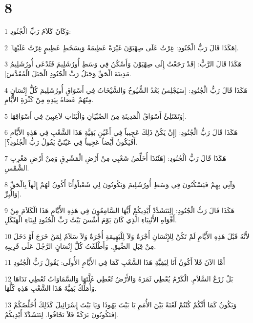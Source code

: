 \chapter{8}

\par 1 وَكَانَ كَلاَمُ رَبِّ الْجُنُودِ:
\par 2 [هَكَذَا قَالَ رَبُّ الْجُنُودِ: غِرْتُ عَلَى صِهْيَوْنَ غَيْرَةً عَظِيمَةً وَبِسَخَطٍ عَظِيمٍ غِرْتُ عَلَيْهَا].
\par 3 هَكَذَا قَالَ الرَّبُّ: [قَدْ رَجَعْتُ إِلَى صِهْيَوْنَ وَأَسْكُنُ فِي وَسَطِ أُورُشَلِيمَ فَتُدْعَى أُورُشَلِيمُ مَدِينَةَ الْحَقِّ وَجَبَلُ رَبِّ الْجُنُودِ الْجَبَلَ الْمُقَدَّسَ].
\par 4 هَكَذَا قَالَ رَبُّ الْجُنُودِ: [سَيَجْلِسُ بَعْدُ الشُّيُوخُ وَالشَّيْخَاتُ فِي أَسْوَاقِ أُورُشَلِيمَ كُلُّ إِنْسَانٍ مِنْهُمْ عَصَاهُ بِيَدِهِ مِنْ كَثْرَةِ الأَيَّامِ.
\par 5 وَتَمْتَلِئُ أَسْوَاقُ الْمَدِينَةِ مِنَ الصِّبْيَانِ وَالْبَنَاتِ لاَعِبِينَ فِي أَسْوَاقِهَا].
\par 6 هَكَذَا قَالَ رَبُّ الْجُنُودِ: [إِنْ يَكُنْ ذَلِكَ عَجِيباً فِي أَعْيُنِ بَقِيَّةِ هَذَا الشَّعْبِ فِي هَذِهِ الأَيَّامِ أَفَيَكُونُ أَيْضاً عَجِيباً فِي عَيْنَيَّ يَقُولُ رَبُّ الْجُنُودِ؟].
\par 7 هَكَذَا قَالَ رَبُّ الْجُنُودِ: [هَئَنَذَا أُخَلِّصُ شَعْبِي مِنْ أَرْضِ الْمَشْرِقِ وَمِنْ أَرْضِ مَغْرِبِ الشَّمْسِ.
\par 8 وَآتِي بِهِمْ فَيَسْكُنُونَ فِي وَسَطِ أُورُشَلِيمَ وَيَكُونُونَ لِي شَعْباًوَأَنَا أَكُونُ لَهُمْ إِلَهاً بِالْحَقِّ وَالْبِرِّ].
\par 9 هَكَذَا قَالَ رَبُّ الْجُنُودِ: [لِتَتَشَدَّدْ أَيْدِيكُمْ أَيُّهَا السَّامِعُونَ فِي هَذِهِ الأَيَّامِ هَذَا الْكَلاَمَ مِنْ أَفْوَاهِ الأَنْبِيَاءِ الَّذِي كَانَ يَوْمَ أُسِّسَ بَيْتُ رَبِّ الْجُنُودِ لِبِنَاءِ الْهَيْكَلِ.
\par 10 لأَنَّهُ قَبْلَ هَذِهِ الأَيَّامِ لَمْ تَكُنْ لِلإِنْسَانِ أُجْرَةٌ وَلاَ لِلْبَهِيمَةِ أُجْرَةٌ وَلاَ سَلاَمٌ لِمَنْ خَرَجَ أَوْ دَخَلَ مِنْ قِبَلِ الضِّيقِ. وَأَطْلَقْتُ كُلَّ إِنْسَانٍ الرَّجُلَ عَلَى قَرِيبِهِ.
\par 11 أَمَّا الآنَ فَلاَ أَكُونُ أَنَا لِبَقِيَّةِ هَذَا الشَّعْبِ كَمَا فِي الأَيَّامِ الأُولَى: يَقُولُ رَبُّ الْجُنُودِ
\par 12 بَلْ زَرْعُ السَّلاَمِ. الْكَرْمُ يُعْطِي ثَمَرَهُ وَالأَرْضُ تُعْطِي غَلَّتَهَا وَالسَّمَاوَاتُ تُعْطِي نَدَاهَا وَأُمَلِّكُ بَقِيَّةَ هَذَا الشَّعْبِ هَذِهِ كُلَّهَا.
\par 13 وَيَكُونُ كَمَا أَنَّكُمْ كُنْتُمْ لَعْنَةً بَيْنَ الأُمَمِ يَا بَيْتَ يَهُوذَا وَيَا بَيْتَ إِسْرَائِيلَ كَذَلِكَ أُخَلِّصُكُمْ فَتَكُونُونَ بَرَكَةً فَلاَ تَخَافُوا. لِتَتَشَدَّدْ أَيْدِيكُمْ].
